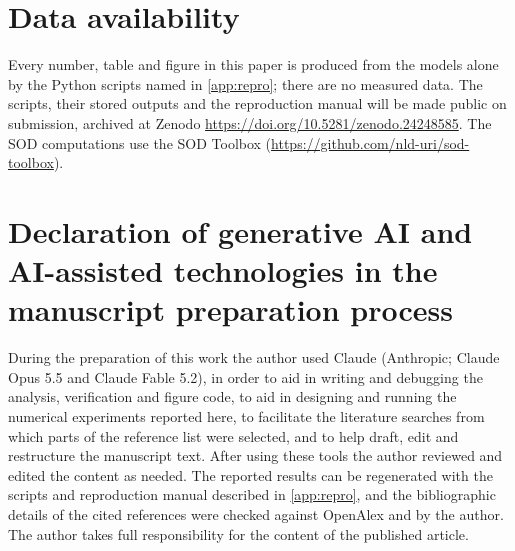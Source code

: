 \documentclass[preprint,12pt]{elsarticle}
\begin{document}
\section*{Data availability}
Every number, table and figure in this paper is produced from the models alone by the Python scripts named in \ref{app:repro}; there are no measured data. The scripts, their stored outputs and the reproduction manual will be made public on submission, archived at Zenodo \url{https://doi.org/10.5281/zenodo.24248585}. The SOD computations use the SOD Toolbox (\url{https://github.com/nld-uri/sod-toolbox}).

\section*{Declaration of generative AI and AI-assisted technologies in the manuscript preparation process}
During the preparation of this work the author used Claude (Anthropic; Claude Opus 5.5 and Claude Fable 5.2), in order to aid in writing and debugging the analysis, verification and figure code, to aid in designing and running the numerical experiments reported here, to facilitate the literature searches from which parts of the reference list were selected, and to help draft, edit and restructure the manuscript text. After using these tools the author reviewed and edited the content as needed. The reported results can be regenerated with the scripts and reproduction manual described in \ref{app:repro}, and the bibliographic details of the cited references were checked against OpenAlex and by the author. The author takes full responsibility for the content of the published article.



\end{document}
